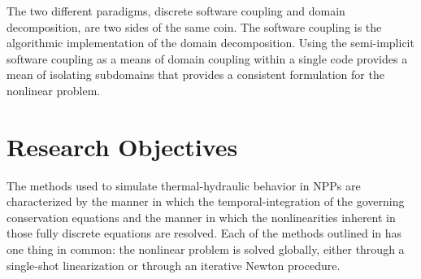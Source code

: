 The two different paradigms, discrete software coupling and domain decomposition, are two sides of the same coin.
The software coupling is the algorithmic implementation of the domain decomposition.
Using the semi-implicit software coupling as a means of domain coupling within a single code provides a mean of isolating subdomains that provides a consistent formulation for the nonlinear problem.

\section{Research Objectives}

The methods used to simulate thermal-hydraulic behavior in NPPs are characterized by the manner in which the temporal-integration of the governing conservation equations and the manner in which the nonlinearities inherent in those fully discrete equations are resolved.
Each of the methods outlined in  has one thing in common: the nonlinear problem is solved globally, either through a single-shot linearization or through an iterative Newton procedure.

